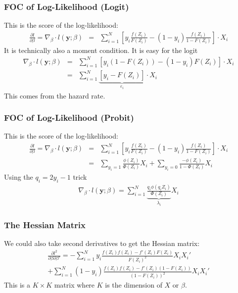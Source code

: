 \documentclass[aspectratio=169]{beamer}
\begin{document}
\begin{frame}
\frametitle{FOC of Log-Likelihood (Logit)}
This is the \alert{score} of the log-likelihood:
\begin{eqnarray*}
\frac{\partial l }{\partial \beta} = \nabla_{\beta} \cdot l(\mathbf{y}; \beta) &=&  \sum_{i=1}^N  \left[ y_i \frac{ f(Z_i) }{ F(Z_i)}  -  (1-y_i) \frac{f(Z_i) }{1-F(Z_i)} \right]  \cdot X_i 
\end{eqnarray*}
It is technically also a \alert{moment condition}. It is easy for the logit
\begin{eqnarray*}
 \nabla_{\beta} \cdot l(\mathbf{y}; \beta) &=&  \sum_{i=1}^N  \left[ y_i (1-F(Z_i)) -  (1-y_i) F(Z_i) \right] \cdot X_i \\
 &=&  \sum_{i=1}^N  \underbrace{\left[ y_i - F(Z_i) \right]}_{\varepsilon_i} \cdot X_i 
\end{eqnarray*}
This comes from the hazard rate.
\end{frame}

\begin{frame}
\frametitle{FOC of Log-Likelihood (Probit)}
This is the \alert{score} of the log-likelihood:
\begin{eqnarray*}
\frac{\partial l }{\partial \beta} = \nabla_{\beta} \cdot l(\mathbf{y}; \beta) &=&  \sum_{i=1}^N  \left[ y_i \frac{ f(Z_i) }{ F(Z_i)}  -  (1-y_i) \frac{f(Z_i) }{1-F(Z_i)} \right] \cdot X_i  \\
 &=&  \sum_{y_i=1}  \frac{\phi(Z_i) }{ \Phi(Z_i)} X_i +\sum_{y_i=0} \frac{-\phi(Z_i) }{1-\Phi(Z_i)} X_i
\end{eqnarray*}
Using the $q_i = 2 y_i -1$ trick
\begin{eqnarray*}
\nabla_{\beta} \cdot l(\mathbf{y}; \beta)= \sum_{i=1}^N \underbrace{\frac{ q_i \phi(q_i Z_i)}{\Phi(Z_i)}}_{\lambda_i} X_i
\end{eqnarray*}
\end{frame}


\begin{frame}
\frametitle{The Hessian Matrix}
We could also take second derivatives to get the \alert{Hessian} matrix:
\begin{eqnarray*}
\frac{\partial l^2 }{\partial \beta \partial \beta'} = - \sum_{i=1}^N   y_i \frac{ f(Z_i)  f(Z_i) - f'(Z_i) F(Z_i) }{ F(Z_i)^2}  X_i X_i' \\
+  \sum_{i=1}^N   (1-y_i) \frac{f(Z_i)f(Z_i) - f'(Z_i)(1-F(Z_i))}{(1-F(Z_i))^2}  X_i X_i'
\end{eqnarray*}
This is a $K\times K$ matrix where $K$ is the dimension of $X$ or $\beta$.
\end{frame}
\end{document}
